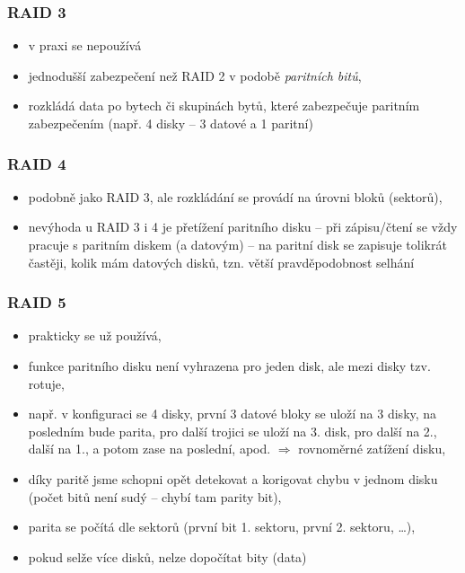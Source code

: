 \documentclass[a4paper, 11pt]{article}
\begin{document}
\newpage

\subsubsection{RAID 3}
\begin{itemize}
    \item v praxi se nepoužívá
    \item jednodušší zabezpečení než RAID 2 v podobě \emph{paritních bitů},
    \item rozkládá data po bytech či skupinách bytů, které zabezpečuje paritním zabezpečením (např. 4 disky -- 3 datové a 1 paritní)
\end{itemize}
 
\subsubsection{RAID 4}
\begin{itemize}
    \item podobně jako RAID 3, ale rozkládání se provádí na úrovni bloků (sektorů),
    \item nevýhoda u RAID 3 i 4 je přetížení paritního disku -- při zápisu/čtení se vždy pracuje s paritním diskem (a datovým) -- na paritní disk se zapisuje tolikrát častěji, kolik mám datových disků, tzn. větší pravděpodobnost selhání
\end{itemize}
 
\subsubsection{RAID 5}
\begin{itemize}
    \item prakticky se už používá,
    \item funkce paritního disku není vyhrazena pro jeden disk, ale mezi disky tzv. rotuje,
    \item např. v konfiguraci se 4 disky, první 3 datové bloky se uloží na 3 disky, na posledním bude parita, pro další trojici se uloží na 3. disk, pro další na 2., další na 1., a potom zase na poslední, apod. $\Rightarrow$ rovnoměrné zatížení disku,
    \item díky paritě jsme schopni opět detekovat a korigovat chybu v jednom disku (počet bitů není sudý -- chybí tam parity bit),
    \item parita se počítá dle sektorů (první bit 1. sektoru, první 2. sektoru, \ldots),
    \item pokud selže více disků, nelze dopočítat bity (data)
\end{itemize}
 
\end{document}
